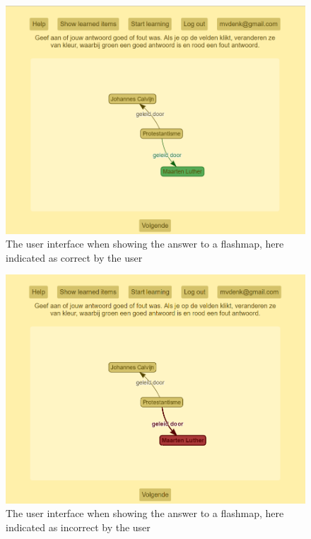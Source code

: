 \begin{figure}
    \centering
    \includegraphics[width=.8\textwidth]{img/ui_fm_answer_correct.png}
    \caption{The user interface when showing the answer to a flashmap, here indicated as correct by the user}
    \label{fig:ui_fm_answer_correct}
\end{figure}

\begin{figure}
    \centering
    \includegraphics[width=.8\textwidth]{img/ui_fm_answer_incorrect.png}
    \caption{The user interface when showing the answer to a flashmap, here indicated as incorrect by the user}
    \label{fig:ui_fm_answer_incorrect}
\end{figure}

